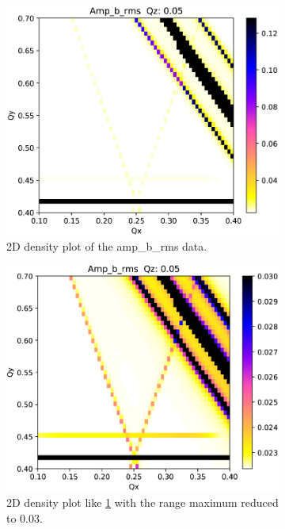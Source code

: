 \documentclass{hitec}
\begin{document}
{{{{{{{{{{{{{\begin{figure}[tb]
  \centering
  \begin{subfigure}[t]{0.49\textwidth}
    \includegraphics[width=\textwidth]{ts_plot1.pdf}
    \caption{2D density plot of the amp_b_rms data.}
    \label{f:plot1}
  \end{subfigure}
  \hfil
  \begin{subfigure}[t]{0.49\textwidth}
    \includegraphics[width=\textwidth]{ts_plot2.pdf}
    \caption{2D density plot like \ref{f:plot1} with the range maximum reduced to 0.03.}
    \label{f:plot2}
  \end{subfigure}
  \caption{}
  \label{f:plot}
\end{figure}

}}}}}}}}}}}}}
\end{document}
